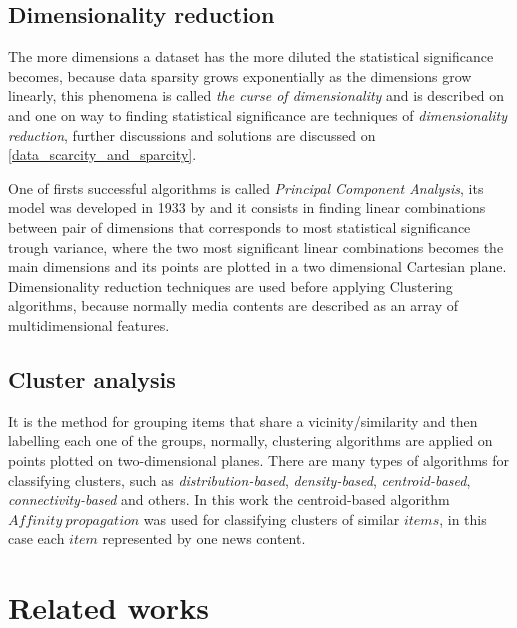\documentclass[ecp,tc,english]{iiufrgs}
\begin{document}
        \subsection{Dimensionality reduction}
        The more dimensions a dataset has the more diluted the statistical significance becomes, 
        because data sparsity grows exponentially as the dimensions grow linearly,  
        this phenomena is called \textit{the curse of dimensionality} and is described on \cite{10.1093/imamat/24.1.59} and one on way to finding statistical significance are techniques of \textit{dimensionality reduction}, further discussions and solutions are discussed on \ref{data_scarcity_and_sparcity}.
        
        One of firsts successful algorithms is called \textit{Principal Component Analysis}, 
        its model was developed in 1933 by \cite{hotelling:33} and it consists in finding linear combinations between pair of dimensions that corresponds to most statistical significance trough variance, where the two most significant linear combinations becomes the main dimensions and its points are plotted in a two dimensional Cartesian plane.
        Dimensionality reduction techniques are used before applying Clustering algorithms, because normally media contents are described as an array of multidimensional features.
        
        \subsection{Cluster analysis}
        It is the method for grouping items that share a vicinity/similarity and then labelling each one of the groups, normally, clustering algorithms are applied on points plotted on two-dimensional planes. There are many types of algorithms for classifying clusters, such as \textit{distribution-based}, \textit{density-based}, \textit{centroid-based}, \textit{connectivity-based} and others. In this work the centroid-based algorithm \(Affinity\ propagation\) was used for classifying clusters of similar \(items\), in this case each \(item\) represented by one news content.

\section{Related works} \label{related_works}
    
\end{document}
